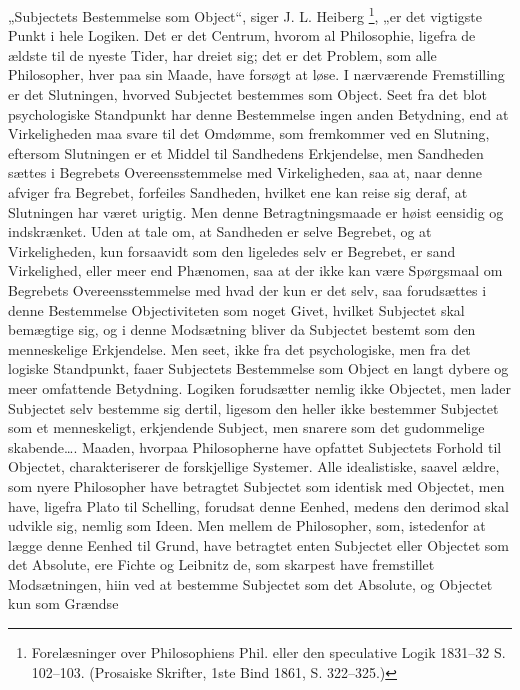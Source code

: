 \documentclass[11pt]{book}
\newcommand{\opage}[1]{\marginnote{\footnotesize\textit{[#1]}}}
\begin{document}
\opage{37} \setcounter{footnote}{0}%
„Subjectets Bestemmelse som Object“, siger J. L. Heiberg%
\footnote{Forelæsninger over Philosophiens Phil. eller den speculative
Logik 1831--32 S. 102--103. (Prosaiske Skrifter, 1ste Bind 1861, S.
322--325.)}, „er det vigtigste Punkt i hele Logiken. Det er det
Centrum, hvorom al Philosophie, ligefra de ældste til de nyeste Tider,
har dreiet sig; det er det Problem, som alle Philosopher, hver paa sin
Maade, have forsøgt at løse. I nærværende Fremstilling er det
Slutningen, hvorved Subjectet bestemmes som Object. Seet fra det blot
psychologiske Standpunkt har denne Bestemmelse ingen anden Betydning,
end at Virkeligheden maa svare til det Omdømme, som fremkommer ved en
Slutning, eftersom Slutningen er et Middel til Sandhedens
Erkjendelse, men Sandheden sættes i Begrebets Overeensstemmelse med
Virkeligheden, saa at, naar denne afviger fra Begrebet, forfeiles
Sandheden, hvilket ene kan reise sig deraf, at Slutningen har været
urigtig. Men denne Betragtningsmaade er høist eensidig og
indskrænket. Uden at tale om, at Sandheden er selve Begrebet, og at
Virkeligheden, kun forsaavidt som den ligeledes selv er Begrebet, er
sand Virkelighed, eller meer end Phænomen, saa at der ikke kan være
Spørgsmaal om Begrebets Overeensstemmelse med hvad der kun er det
selv, saa forudsættes i denne Bestemmelse Objectiviteten som noget
Givet, hvilket Subjectet skal bemægtige sig, og i denne Modsætning
bliver da Subjectet bestemt som den menneskelige Erkjendelse. Men
seet, ikke fra det psychologiske, men fra det logiske Standpunkt,
faaer Subjectets Bestemmelse som Object en langt dybere og meer
omfattende Betydning. Logiken forudsætter nemlig ikke Objectet, men
lader Subjectet selv bestemme sig dertil, ligesom den heller ikke
bestemmer Subjectet som et menneskeligt, erkjendende Subject, men
snarere som det gudommelige skabende\dots. Maaden, hvorpaa
Philosopherne have opfattet Subjectets Forhold til Objectet,
charakteriserer de forskjellige Systemer. Alle idealistiske, saavel
ældre, som
\opage{38} \setcounter{footnote}{0}%
nyere Philosopher have betragtet Subjectet som identisk med Objectet,
men have, ligefra Plato til Schelling, forudsat denne Eenhed, medens
den derimod skal udvikle sig, nemlig som Ideen. Men mellem de
Philosopher, som, istedenfor at lægge denne Eenhed til Grund, have
betragtet enten Subjectet eller Objectet som det Absolute, ere Fichte
og Leibnitz de, som skarpest have fremstillet Modsætningen, hiin ved
at bestemme Subjectet som det Absolute, og Objectet kun som Grændse
\end{document}
